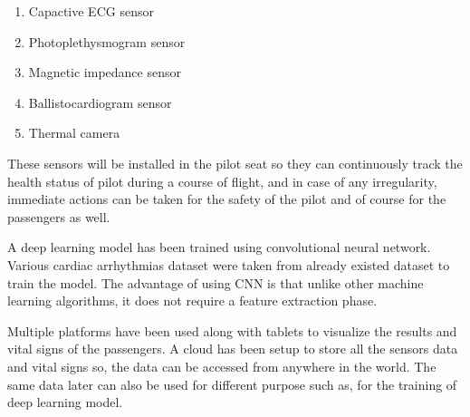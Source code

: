 \begin{enumerate}
	\item Capactive ECG sensor
	\item Photoplethysmogram sensor
	\item Magnetic impedance sensor
	\item Ballistocardiogram sensor
	\item Thermal camera
\end{enumerate}

These sensors will be installed in the pilot seat so they can continuously track the health status of pilot during a course of flight, and in case of any irregularity, immediate actions can be taken for the safety of the pilot and of course for the passengers as well.

A deep learning model has been trained using convolutional neural network.  Various cardiac arrhythmias dataset were taken from already existed dataset to train the model. The advantage of using CNN is that unlike other machine learning algorithms, it does not require a feature extraction phase.

Multiple platforms have been used along with tablets to visualize the results and vital signs of the passengers. A cloud has been setup to store all the sensors data and vital signs so, the data can be accessed from anywhere in the world.
The same data later can also be used for different purpose such as, for the training of deep learning model.


